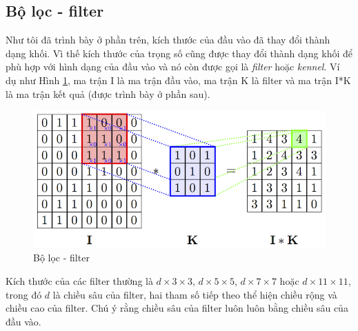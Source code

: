 \subsection{Bộ lọc - filter}
\hspace{5mm} Như tôi đã trình bày ở phần trên, kích thước của đầu vào đã thay đổi thành dạng khối. Vì thế kích thước của trọng số cũng được thay đổi thành dạng khối để phù hợp với hình dạng của đầu vào và nó còn được gọi là \textit{filter} hoặc \textit{kennel}.  Ví dụ như Hình \ref{fig:filter}, ma trận I là ma trận đầu vào, ma trận K là filter và ma trận I*K là ma trận kết quả (được trình bày ở phần sau).
\begin{center}
\begin{figure}[htp]
	\begin{center}
		\includegraphics[scale=1.2]{chap4/image/minhHoaTichChap.png}
	\end{center}
	\caption{Bộ lọc - filter}
	\label{fig:filter}
\end{figure}
\end{center}
\hspace{5mm} Kích thước của các filter thường là $d\times3\times3$, $d\times5\times5$, $d\times7\times7$  hoặc $d\times11\times11$, trong đó $d$ là chiều sâu của filter, hai tham số tiếp theo thể hiện chiều rộng và chiều cao của filter. Chú ý rằng chiều sâu của filter luôn luôn bằng chiều sâu của đầu vào.
